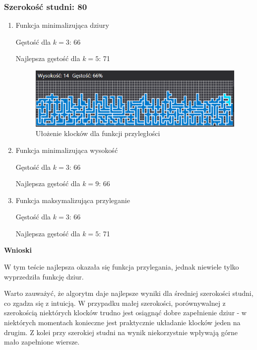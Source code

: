 \documentclass{article}
\begin{document}
\subsubsection{Szerokość studni: 80}
\begin{enumerate}

\item Funkcja minimalizująca dziury

Gęstość dla $k=3$: 66

Najlepsza gęstość dla $k=5$: 71

\begin{figure}[H]
\includegraphics[width=\textwidth]{szeroka_plansza.PNG}
\caption{Ułożenie klocków dla funkcji przyległości}
\end{figure}

\item Funkcja minimalizująca wysokość

Gęstość dla $k=3$: 66

Najlepsza gęstość dla $k=9$: 66

\item Funkcja maksymalizująca przyleganie

Gęstość dla $k=3$: 66

Najlepsza gęstość dla $k=5$: 71

\end{enumerate}
\textbf{Wnioski}

W tym teście najlepsza okazała się funkcja przylegania, jednak niewiele tylko wyprzedziła funkcję dziur.

Warto zauważyć, że algorytm daje najlepsze wyniki dla średniej szerokości studni, co zgadza się z intuicją.
W przypadku małej szerokości, porównywalnej z szerokością niektórych klocków trudno jest osiągnąć dobre zapełnienie dziur - w niektórych momentach konieczne jest praktycznie układanie klocków jeden na drugim.
Z kolei przy szerokiej studni na wynik niekorzystnie wpływają górne mało zapełnione wiersze.
\end{document}
